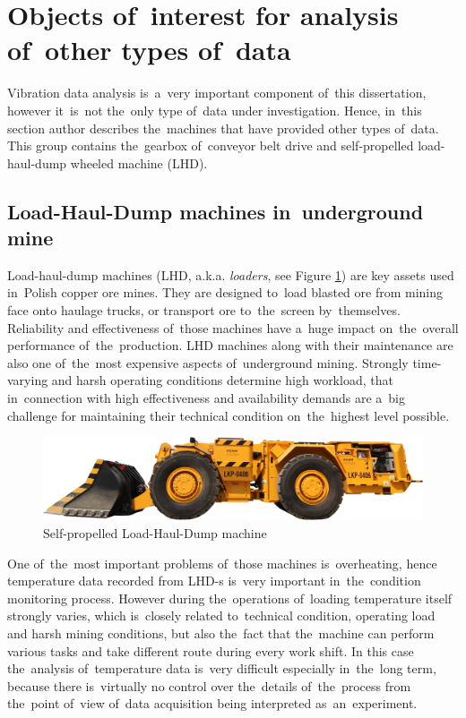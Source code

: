 \section{Objects of~interest for analysis of~other types of~data}
 
Vibration data analysis is~a~very important component of~this dissertation, however it~is~not the~only type of~data under investigation. Hence, in~this section author describes the~machines that have provided other types of~data. This group contains the~gearbox of~conveyor belt drive and self-propelled load-haul-dump wheeled machine (LHD). 

\subsection{Load-Haul-Dump machines in~underground mine}

Load-haul-dump machines (LHD, a.k.a. \emph{loaders}, see Figure \ref{fig:obj_lhd}) are key assets used in~Polish copper ore mines. They are designed to~load blasted ore from mining face onto haulage trucks, or transport ore to~the~screen by~themselves. Reliability and effectiveness of~those machines have a~huge impact on~the~overall performance of~the~production. LHD machines along with their maintenance are also one of~the~most expensive aspects of~underground mining. Strongly time-varying and harsh operating conditions determine high workload, that in~connection with high effectiveness and availability demands are a~big challenge for maintaining their technical condition on~the~highest level possible.

\begin{figure}[ht!]
\centering
\includegraphics[width=\textwidth]{wykresy/obj_lhd.png}
\caption{Self-propelled Load-Haul-Dump machine}
\label{fig:obj_lhd}
\end{figure}

One of~the~most important problems of~those machines is~overheating, hence temperature data recorded from LHD-s is~very important in~the~condition monitoring process. However during the~operations of~loading temperature itself strongly varies, which is~closely related to~technical condition, operating load and harsh mining conditions, but also the~fact that the~machine can perform various tasks and take different route during every work shift. In this case the~analysis of~temperature data is~very difficult especially in~the~long term, because there is~virtually no control over the~details of~the~process from the~point of~view of~data acquisition being interpreted as~an~experiment. 

